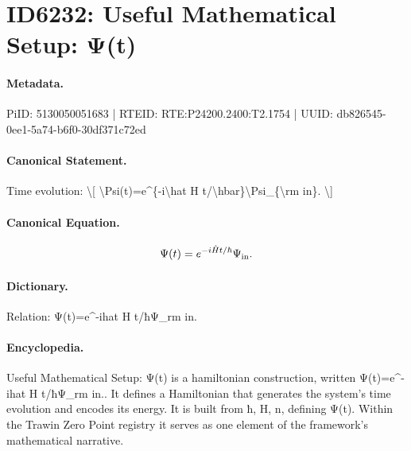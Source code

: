 \section*{ID6232: Useful Mathematical Setup: Ψ(t)}
\paragraph{Metadata.}
PiID: 5130050051683 | RTEID: RTE:P24200.2400:T2.1754 | UUID: db826545-0ee1-5a74-b6f0-30df371c72ed

\paragraph{Canonical Statement.}
Time evolution: \textbackslash{}[ \textbackslash{}Psi(t)=e\textasciicircum{}\{-i\textbackslash{}hat H t/\textbackslash{}hbar\}\textbackslash{}Psi\_\{\textbackslash{}rm in\}. \textbackslash{}]

\paragraph{Canonical Equation.}
\[
\Psi(t)=e^{-i\hat H t/\hbar}\Psi_{\rm in}.
\]

\paragraph{Dictionary.}
Relation: Ψ(t)=e\textasciicircum{}-ihat H t/ħΨ\_rm in.

\paragraph{Encyclopedia.}
Useful Mathematical Setup: Ψ(t) is a hamiltonian construction, written Ψ(t)=e\textasciicircum{}-ihat H t/ħΨ\_rm in.. It defines a Hamiltonian that generates the system's time evolution and encodes its energy. It is built from ħ, H, n, defining Ψ(t). Within the Trawin Zero Point registry it serves as one element of the framework's mathematical narrative.
